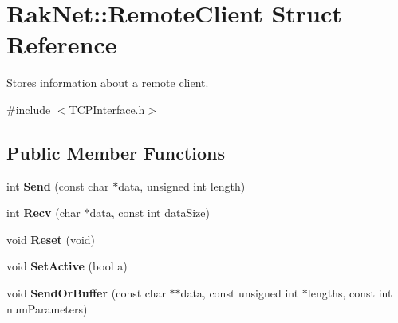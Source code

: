 \hypertarget{struct_rak_net_1_1_remote_client}{\section{Rak\-Net\-:\-:Remote\-Client Struct Reference}
\label{struct_rak_net_1_1_remote_client}
}


Stores information about a remote client.  




{\ttfamily \#include $<$T\-C\-P\-Interface.\-h$>$}

\subsection*{Public Member Functions}
\begin{DoxyCompactItemize}
\item 
\hypertarget{struct_rak_net_1_1_remote_client_a83f41dddd654734d1d3afdfedcc12bdb}{int {\bfseries Send} (const char $\ast$data, unsigned int length)}\label{struct_rak_net_1_1_remote_client_a83f41dddd654734d1d3afdfedcc12bdb}

\item 
\hypertarget{struct_rak_net_1_1_remote_client_ac62753ef3c4113d2ee845f7501d44834}{int {\bfseries Recv} (char $\ast$data, const int data\-Size)}\label{struct_rak_net_1_1_remote_client_ac62753ef3c4113d2ee845f7501d44834}

\item 
\hypertarget{struct_rak_net_1_1_remote_client_ac40e51bfa1ce2dba78b455f37c1548c9}{void {\bfseries Reset} (void)}\label{struct_rak_net_1_1_remote_client_ac40e51bfa1ce2dba78b455f37c1548c9}

\item 
\hypertarget{struct_rak_net_1_1_remote_client_a3239997d9174b0c1ac5114a16fbe365b}{void {\bfseries Set\-Active} (bool a)}\label{struct_rak_net_1_1_remote_client_a3239997d9174b0c1ac5114a16fbe365b}

\item 
\hypertarget{struct_rak_net_1_1_remote_client_ad0334ec7615f0a2144cb4718557fd6a4}{void {\bfseries Send\-Or\-Buffer} (const char $\ast$$\ast$data, const unsigned int $\ast$lengths, const int num\-Parameters)}\label{struct_rak_net_1_1_remote_client_ad0334ec7615f0a2144cb4718557fd6a4}

\end{DoxyCompactItemize}
